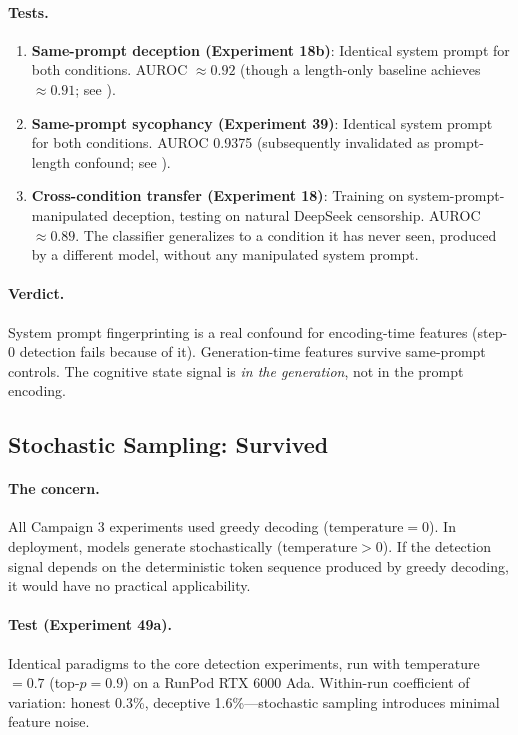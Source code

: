 \paragraph{Tests.}

\begin{enumerate}[leftmargin=*]
    \item \textbf{Same-prompt deception (Experiment 18b)}: Identical system prompt for both conditions. AUROC $\approx 0.92$ (though a length-only baseline achieves $\approx 0.91$; see ).
    \item \textbf{Same-prompt sycophancy (Experiment 39)}: Identical system prompt for both conditions. AUROC 0.9375 (subsequently invalidated as prompt-length confound; see ).
    \item \textbf{Cross-condition transfer (Experiment 18)}: Training on system-prompt-manipulated deception, testing on natural DeepSeek censorship. AUROC $\approx 0.89$. The classifier generalizes to a condition it has never seen, produced by a different model, without any manipulated system prompt.
\end{enumerate}

\paragraph{Verdict.} System prompt fingerprinting is a real confound for encoding-time features (step-0 detection fails because of it). Generation-time features survive same-prompt controls. The cognitive state signal is \emph{in the generation}, not in the prompt encoding.

\subsection{Stochastic Sampling: Survived}
\label{sec:stochastic}

\paragraph{The concern.} All Campaign 3 experiments used greedy decoding ($\text{temperature} = 0$). In deployment, models generate stochastically ($\text{temperature} > 0$). If the detection signal depends on the deterministic token sequence produced by greedy decoding, it would have no practical applicability.

\paragraph{Test (Experiment 49a).} Identical paradigms to the core detection experiments, run with temperature $= 0.7$ (top-$p = 0.9$) on a RunPod RTX 6000 Ada. Within-run coefficient of variation: honest 0.3\%, deceptive 1.6\%---stochastic sampling introduces minimal feature noise.

